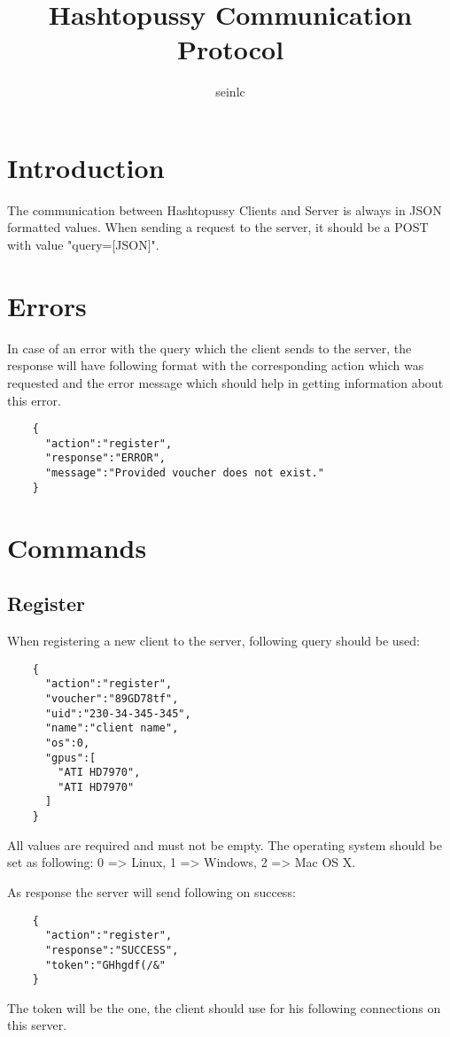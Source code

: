 \documentclass{article}
\author{seinlc}
\begin{document}
	\title{Hashtopussy Communication Protocol}
	\maketitle
	\section*{Introduction}
	The communication between Hashtopussy Clients and Server is always in JSON formatted values. When sending a request to the server, it should be a POST with value
	"query=[JSON]".
	
	\section*{Errors}
	In case of an error with the query which the client sends to the server, the response will have following format with the corresponding action which was requested and the error message which should help in getting information about this error.
	\begin{verbatim}
	{
	  "action":"register",
	  "response":"ERROR",
	  "message":"Provided voucher does not exist."
	}
	\end{verbatim}
	\pagebreak
	\section*{Commands}
	
	\subsection*{Register}
	When registering a new client to the server, following query should be used:
	\begin{verbatim}
	{  
	  "action":"register",
	  "voucher":"89GD78tf",
	  "uid":"230-34-345-345",
	  "name":"client name",
	  "os":0,
	  "gpus":[  
	    "ATI HD7970",
	    "ATI HD7970"
	  ]
	}
	\end{verbatim}
	All values are required and must not be empty. The operating system should be set as following: 0 => Linux, 1 => Windows, 2 => Mac OS X.
	
	As response the server will send following on success:
	\begin{verbatim}
	{
	  "action":"register",
	  "response":"SUCCESS",
	  "token":"GHhgdf(/&"
	} 
	\end{verbatim}
	The token will be the one, the client should use for his following connections on this server.
	
\end{document}
